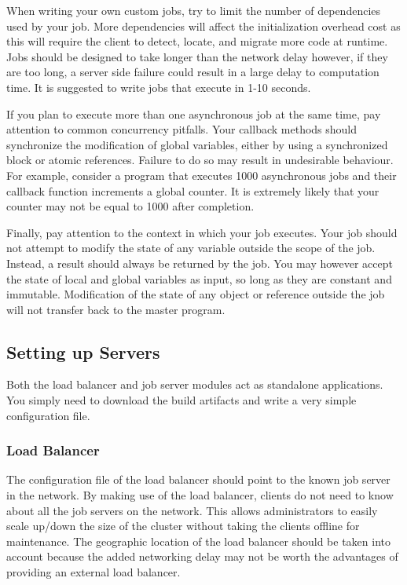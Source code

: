 When writing your own custom jobs, try to limit the number of
dependencies used by your job.
More dependencies will affect the initialization overhead cost
as this will require the client to detect, locate, and migrate
more code at runtime.
Jobs should be designed to take longer than the network
delay however, if they are too long, a server side failure
could result in a large delay to computation time.
It is suggested to write jobs that execute in 1-10 seconds.

If you plan to execute more than one asynchronous job at the
same time, pay attention to common concurrency pitfalls.
Your callback methods should synchronize the modification
of global variables, either by using a synchronized block or
atomic references.
Failure to do so may result in undesirable behaviour.
For example, consider a program that executes 1000 asynchronous
jobs and their callback function increments a global counter.
It is extremely likely that your counter may not be equal to 1000
after completion.

Finally, pay attention to the context in which your job executes.
Your job should not attempt to modify the state of any variable
outside the scope of the job.
Instead, a result should always be returned by the job.
You may however accept the state of local and global variables
as input, so long as they are constant and immutable.
Modification of the state of any object or reference outside the job
will not transfer back to the master program.

\subsection{Setting up Servers}\label{subsec:settingUpServers}

Both the load balancer and job server modules act as standalone
applications.
You simply need to download the build artifacts and write
a very simple configuration file.


\subsubsection{Load Balancer}

The configuration file of the load balancer should point
to the known job server in the network.
By making use of the load balancer, clients do not
need to know about all the job servers on the network.
This allows administrators to easily scale up/down the
size of the cluster without taking the clients offline for
maintenance.
The geographic location of the load balancer should
be taken into account because the added networking delay
may not be worth the advantages of providing an external
load balancer.

